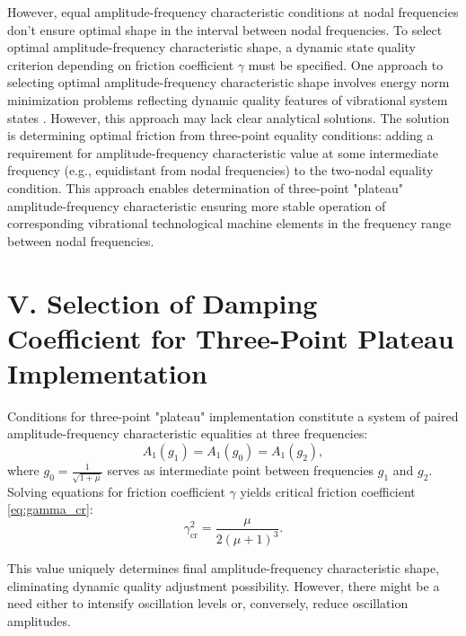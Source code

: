 \documentclass[12pt, a4paper]{article}
\begin{document}
	However, equal amplitude-frequency characteristic conditions at nodal frequencies don't ensure optimal shape in the interval between nodal frequencies. To select optimal amplitude-frequency characteristic shape, a dynamic state quality criterion depending on friction coefficient $\gamma$ must be specified. One approach to selecting optimal amplitude-frequency characteristic shape involves energy norm minimization problems reflecting dynamic quality features of vibrational system states \cite{Nishihara2002}. However, this approach may lack clear analytical solutions. The solution is determining optimal friction from three-point equality conditions: adding a requirement for amplitude-frequency characteristic value at some intermediate frequency (e.g., equidistant from nodal frequencies) to the two-nodal equality condition. This approach enables determination of three-point "plateau" amplitude-frequency characteristic ensuring more stable operation of corresponding vibrational technological machine elements in the frequency range between nodal frequencies. 
	
	\section*{V. Selection of Damping Coefficient for Three-Point Plateau Implementation}
	
	Conditions for three-point "plateau" implementation constitute a system of paired amplitude-frequency characteristic equalities at three frequencies: 
	\begin{equation}
		A_1(g_1) = A_1(g_0) = A_1(g_2),
		\label{eq:gamma_cr}
	\end{equation}
	where $g_0 = \frac{1}{\sqrt{1+\mu}}$ serves as intermediate point between frequencies $g_1$ and $g_2$. Solving equations for friction coefficient $\gamma$ yields critical friction coefficient \eqref{eq:gamma_cr}:
	\begin{equation}
		\gamma_{\text{cr}}^{2} = \frac{\mu}{2 \left(\mu +1\right)^{3}}.
	\end{equation}
	
	This value uniquely determines final amplitude-frequency characteristic shape, eliminating dynamic quality adjustment possibility. However, there might be a need either to intensify oscillation levels or, conversely, reduce oscillation amplitudes. 
	
\end{document}
